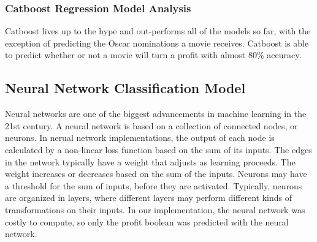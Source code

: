 \documentclass[11pt]{article}
\begin{document}
\hypertarget{catboost-regression-model-analysis}{%
	\subsubsection{Catboost Regression Model
		Analysis}\label{catboost-regression-model-analysis}}

Catboost lives up to the hype and out-performs all of the models so far, with the exception of predicting the Oscar nominations a movie receives. Catboost is able to predict whether or not a movie will turn a profit with almost 80\% accuracy.


%
%
%


\hypertarget{neural-network-classification-model}{%
	\subsection{Neural Network Classification Model}\label{neural-network-classification-model}}
	
Neural networks are one of the biggest advancements in machine learning in the 21st century. A neural network is based on a collection of connected nodes, or neurons. In nerual network implementations, the output of each node is calculated by a non-linear loss function based on the sum of its inputs. The edges in the network typically have a weight that adjusts as learning proceeds. The weight increases or decreases based on the sum of the inputs. Neurons may have a threshold for the sum of inputs, before they are activated. Typically, neurons are organized in layers, where different layers may perform different kinds of transformations on their inputs. In our implementation, the neural network was costly to compute, so only the profit boolean was predicted with the neural network.
\end{document}
